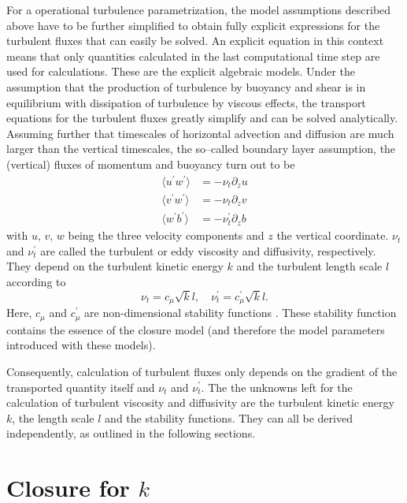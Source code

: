 For a operational turbulence parametrization, the model assumptions described 
above have to be further simplified to obtain fully explicit expressions 
for the turbulent fluxes that can easily be solved. An explicit equation in 
this context means that only quantities calculated in the last computational 
time step are used for calculations. These are the explicit algebraic 
models. Under the assumption that the production of turbulence by buoyancy and 
shear is in equilibrium with dissipation of turbulence by viscous effects, the 
transport equations for the turbulent fluxes greatly simplify and can be solved 
analytically. Assuming further that timescales of horizontal advection and 
diffusion are much larger than the vertical timescales, the so--called boundary 
layer assumption, the (vertical) fluxes of momentum and buoyancy turn out to be 
\begin{align}
 \label{bblassum}
 \langle u^\prime w^\prime \rangle &= - \nu_t \partial_z u \\
 \langle v^\prime w^\prime \rangle &= - \nu_t \partial_z v \\
 \langle w^\prime b^\prime \rangle &= - \nu_t^\prime \partial_z b
\end{align}
with $u,\,v,\,w$ being the three velocity components and $z$ the vertical 
coordinate. $\nu_t$ and $\nu_t^\prime$ are called the turbulent or eddy 
viscosity and diffusivity, respectively. They depend on the turbulent kinetic 
energy $k$ and the turbulent length scale $l$ according to
\begin{equation}
 \label{turbdiff}
 \nu_t = c_\mu \sqrt{k} l, \quad \nu_t^\prime = c_\mu^\prime \sqrt{k} l.
\end{equation}
Here, $c_\mu$ and $c_\mu^\prime$ are non-dimensional stability 
functions \citep[][]{gotm1999}. These stability function contains the essence 
of the closure model (and therefore the model parameters introduced with these 
models).

Consequently, calculation of turbulent fluxes only depends on the gradient of 
the transported quantity itself and $\nu_t$ and $\nu_t^\prime$. The the 
unknowns left for the calculation of turbulent viscosity and 
diffusivity are the turbulent kinetic energy $k$, the length scale $l$ and the 
stability functions. They can all be derived independently, as outlined in the 
following sections.

\section{Closure for $k$ }\label{kclosure}

